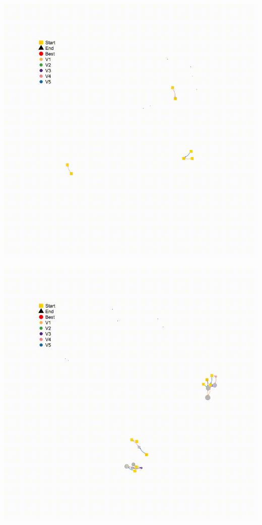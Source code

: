 \documentclass[
]{article}
\begin{document}
\begin{center}\includegraphics{gifs/moeadps_uf7} \end{center}

\begin{center}\includegraphics{gifs/nsga2_uf7} \end{center}
\end{document}
